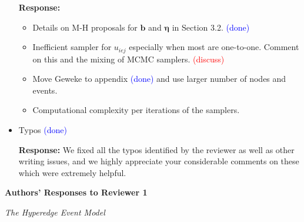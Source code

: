 \documentclass[12pt]{article}
\theoremstyle{definition}
\begin{document}
\begin{itemize}
		\textbf{  Response:} 
		\begin{itemize}
			\item Details on M-H proposals for $\boldsymbol{b}$ and $\boldsymbol{\eta}$ in Section 3.2. \textcolor{blue}{(done)}
			\item Inefficient sampler for $u_{iej}$ especially when most are one-to-one. Comment on this and the mixing of MCMC samplers.  \textcolor{red}{(discuss)} 
			\item Move Geweke to appendix \textcolor{blue}{(done)} and use larger number of nodes and events.
			\item Computational complexity per iterations of the samplers.
		\end{itemize}
		
	\item Typos \textcolor{blue}{(done)}
	
		\textbf{  Response:} We fixed all the typos identified by the reviewer as well as other writing issues, and we highly appreciate your considerable comments on these which were extremely helpful.
\end{itemize}



\begin{center}

\textbf{Authors' Responses to Reviewer 1}
\end{center}
\begin{center}
\textsl{The Hyperedge Event Model}
\end{center}
\end{document}
